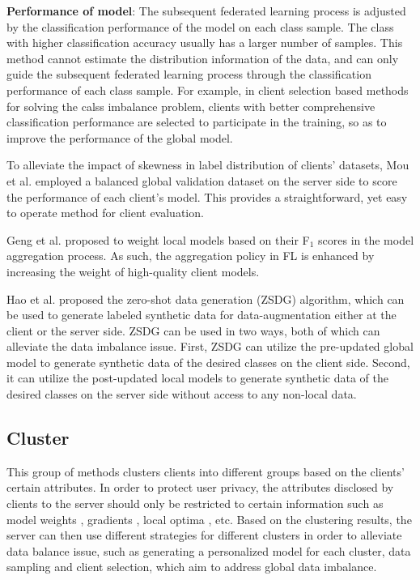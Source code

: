 \documentclass[10pt,journal,compsoc]{IEEEtran}
\begin{document}
\textbf{Performance of model}: The subsequent federated learning process is adjusted by the classification performance of the model on each class sample. The class with higher classification accuracy usually has a larger number of samples. This method cannot estimate the distribution information of the data, and can only guide the subsequent federated learning process through the classification performance of each class sample. For example, in client selection based methods for solving the calss imbalance problem, clients with better comprehensive classification performance are selected to participate in the training, so as to improve the performance of the global model.

To alleviate the impact of skewness in label distribution of clients' datasets, Mou et al. \cite{mou2021optimized} employed a balanced global validation dataset on the server side to score the performance of each client's model. This provides a straightforward, yet easy to operate method for client evaluation.

Geng et al. \cite{geng2022bearing} proposed to weight local models based on their F$_1$ scores in the model aggregation process. As such, the aggregation policy in FL is enhanced by increasing the weight of high-quality client models. 

Hao et al. \cite{hao2021towards} proposed the zero-shot data generation (ZSDG) algorithm, which can be used to generate labeled synthetic data for data-augmentation either at the client or the server side. ZSDG can be used in two ways, both of which can alleviate the data imbalance issue. First, ZSDG can utilize the pre-updated global model to generate synthetic data of the desired classes on the client side. Second, it can utilize the post-updated local models to generate synthetic data of the desired classes on the server side without access to any non-local data.
\vspace{-0.2cm} 

\subsection{Cluster}
This group of methods clusters clients into different groups based on the clients' certain attributes. In order to protect user privacy, the attributes disclosed by clients to the server should only be restricted to certain information such as model weights \cite{ghosh2019robust} \cite{xie2020multi}, gradients \cite{briggs2020federated} \cite{sattler2020clustered}, local optima \cite{ghosh2020efficient} \cite{mansour2020three}, etc. Based on the clustering results, the server can then use different strategies for different clusters in order to alleviate data balance issue, such as generating a personalized model for each cluster, data sampling and client selection, which aim to address global data imbalance. 
\end{document}
